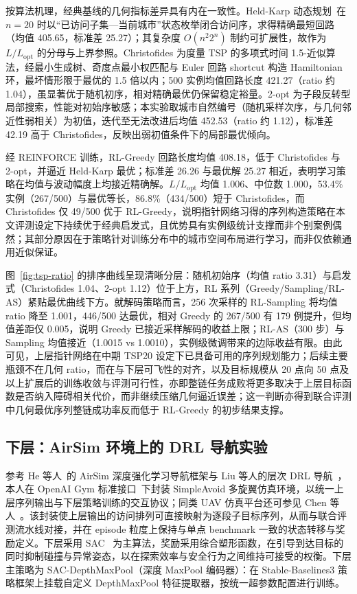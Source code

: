 按算法机理，经典基线的几何指标差异具有内在一致性。Held-Karp 动态规划~\cite{lin1973karp}在 $n=20$ 时以``已访问子集—当前城市''状态枚举闭合访问序，求得精确最短回路（均值 405.65，标准差 25.27）；其复杂度 $O(n^2 2^n)$ 制约可扩展性，故作为 $L/L_{\mathrm{opt}}$ 的分母与上界参照。Christofides 为度量 TSP 的多项式时间 1.5-近似算法，经最小生成树、奇度点最小权匹配与 Euler 回路 shortcut 构造 Hamiltonian 环，最坏情形限于最优的 1.5 倍以内；500 实例均值回路长度 421.27（ratio 约 1.04），虽显著优于随机初序，相对精确最优仍保留稳定裕量。2-opt 为子段反转型局部搜索，性能对初始序敏感；本实验取城市自然编号（随机采样次序，与几何邻近性弱相关）为初值，迭代至无法改进后均值 452.53（ratio 约 1.12），标准差 42.19 高于 Christofides，反映出弱初值条件下的局部最优倾向。

经 REINFORCE 训练，RL-Greedy 回路长度均值 408.18，低于 Christofides 与 2-opt，并逼近 Held-Karp 最优；标准差 26.26 与最优解 25.27 相近，表明学习策略在均值与波动幅度上均接近精确解。$L/L_{\mathrm{opt}}$ 均值 1.006、中位数 1.000，53.4\% 实例（267/500）与最优等长，86.8\%（434/500）短于 Christofides，而 Christofides 仅 49/500 优于 RL-Greedy，说明指针网络习得的序列构造策略在本文评测设定下持续优于经典启发式，且优势具有实例级统计支撑而非个别案例偶然；其部分原因在于策略针对训练分布中的城市空间布局进行学习，而非仅依赖通用近似保证。

图~\ref{fig:tsp-ratio} 的排序曲线呈现清晰分层：随机初始序（均值 ratio 3.31）与启发式（Christofides 1.04、2-opt 1.12）位于上方，RL 系列（Greedy/Sampling/RL-AS）紧贴最优曲线下方。就解码策略而言，256 次采样的 RL-Sampling 将均值 ratio 降至 1.001，446/500 达最优，相对 Greedy 的 267/500 有 179 例提升，但均值差距仅 0.005，说明 Greedy 已接近采样解码的收益上限；RL-AS（300 步）与 Sampling 均值接近（1.0015 vs 1.0010），实例级微调带来的边际收益有限。由此可见，上层指针网络在中期 TSP20 设定下已具备可用的序列规划能力；后续主要瓶颈不在几何 ratio，而在与下层可飞性的对齐，以及目标规模从 20 点向 50 点及以上扩展后的训练收敛与评测可行性，亦即整链任务成败将更多取决于上层目标函数是否纳入障碍相关代价，而非继续压缩几何逼近误差；这一判断亦得到联合评测中几何最优序列整链成功率反而低于 RL-Greedy 的初步结果支撑。

\subsection{下层：AirSim 环境上的 DRL 导航实验}

参考 He 等人~\cite{he2021explainable}的 AirSim 深度强化学习导航框架与 Liu 等人的层次 DRL 导航~\cite{liu2022hrl}，本人在 OpenAI Gym 标准接口~\cite{brockman2016gym}下封装 SimpleAvoid 多旋翼仿真环境，以统一上层序列输出与下层策略训练的交互协议；同类 UAV 仿真平台还可参见 Chen 等人~\cite{chen2022uavsim}。该封装使上层输出的访问排列可直接映射为逐段子目标序列，从而与联合评测流水线对接，并在 episode 粒度上保持与单点 benchmark 一致的状态转移与奖励定义。下层采用 SAC~\cite{haarnoja2018sac,fang2024sac} 为主算法，奖励采用综合塑形函数，在引导到达目标的同时抑制碰撞与异常姿态，以在探索效率与安全行为之间维持可接受的权衡。下层主策略为 SAC-DepthMaxPool（深度 MaxPool 编码器）：在 Stable-Baselines3 策略框架上挂载自定义 DepthMaxPool 特征提取器，按统一超参数配置进行训练。

